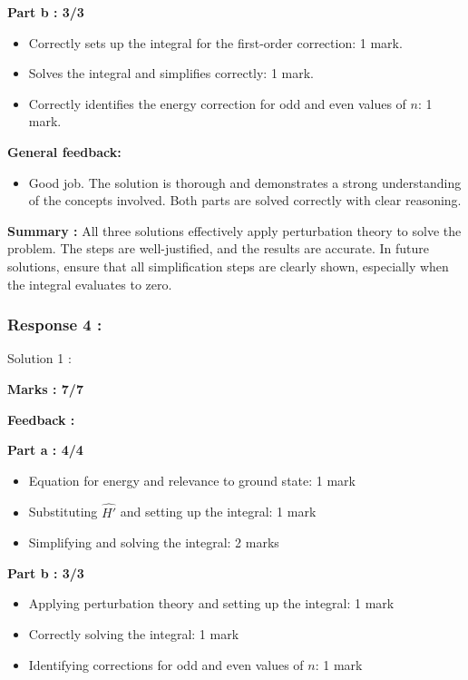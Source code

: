 \documentclass[a4paper,11pt]{article}
\begin{document}
\textbf{Part b : 3/3}

\begin{itemize}
    \item Correctly sets up the integral for the first-order correction: 1 mark.
    \item Solves the integral and simplifies correctly: 1 mark.
    \item Correctly identifies the energy correction for odd and even values of $n$: 1 mark.
\end{itemize}

\textbf{General feedback:}

\begin{itemize}
    \item Good job. The solution is thorough and demonstrates a strong understanding of the concepts involved. Both parts are solved correctly with clear reasoning.
\end{itemize}

\textbf{Summary :}
All three solutions effectively apply perturbation theory to solve the problem. The steps are well-justified, and the results are accurate. In future solutions, ensure that all simplification steps are clearly shown, especially when the integral evaluates to zero.


\subsubsection*{Response 4 :}

Solution 1 :

\textbf{Marks : 7/7}

\textbf{Feedback :}

\textbf{Part a : 4/4}

\begin{itemize}
    \item Equation for energy and relevance to ground state: 1 mark
    \item Substituting $\hat{H'}$ and setting up the integral: 1 mark
    \item Simplifying and solving the integral: 2 marks
\end{itemize}


\textbf{Part b : 3/3}

\begin{itemize}
    \item Applying perturbation theory and setting up the integral: 1 mark
    \item Correctly solving the integral: 1 mark
    \item Identifying corrections for odd and even values of $n$: 1 mark
\end{itemize}
\end{document}
